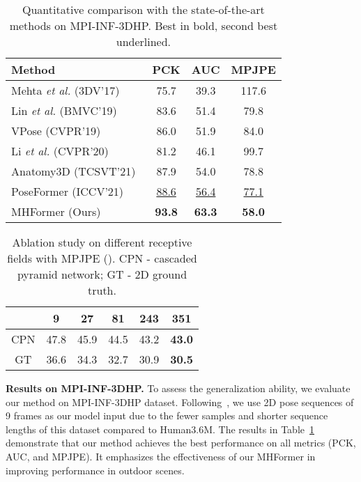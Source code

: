 \documentclass[10pt,twocolumn,letterpaper]{article}
\def\VspaceL{\vspace{-0.40cm}}
\def\VspaceS{\vspace{-0.30cm}}
\begin{document}
\begin{table}
  \footnotesize
  \centering
  \caption
  {
    Quantitative comparison with the state-of-the-art methods on MPI-INF-3DHP. 
    Best in bold, second best underlined.
  }
  \setlength{\tabcolsep}{3.90mm} 
  \begin{tabular}{@{}l|ccc@{}}
  \toprule
  Method & PCK  & AUC  & MPJPE  \\
  \midrule
  Mehta \emph{et al.} (3DV'17)~\cite{mehta2017monocular} & 75.7 & 39.3 & 117.6 \\
  Lin \emph{et al.} (BMVC'19)~\cite{lin2019trajectory} & 83.6 & 51.4 & 79.8 \\
  VPose (CVPR'19)~\cite{pavllo20193d} &86.0 &51.9 &84.0 \\
  Li \emph{et al.} (CVPR'20)~\cite{li2020cascaded} &81.2 &46.1 &99.7 \\
  Anatomy3D (TCSVT'21)~\cite{chen2021anatomy} &87.9 &54.0 &78.8 \\
  PoseFormer (ICCV'21)~\cite{poseformer} &\underline{88.6} &\underline{56.4} &\underline{77.1} \\ 

  \midrule
  MHFormer (Ours) &\textbf{93.8} &\textbf{63.3} &\textbf{58.0} \\
  \bottomrule
  \end{tabular}
  \label{table:3dhp}
  \VspaceS
\end{table}

\begin{table}[tb]
  \centering  
  \footnotesize
  \caption
  {
    Ablation study on different receptive fields with MPJPE ().
    CPN - cascaded pyramid network; 
    GT - 2D ground truth.
  }
  \setlength{\tabcolsep}{4.25mm}
  \begin{tabular}{cccccc}
  \toprule [1pt]
   &9 &27 &81 &243 &351 \\
  \midrule [0.5pt]
  CPN &47.8 &45.9 &44.5 &43.2 &\textbf{43.0} \\
  GT &36.6 &34.3 &32.7 &30.9 &\textbf{30.5} \\
  \toprule [1pt]
  \end{tabular}
  \label{table:frames}
  \VspaceL
\end{table}

\noindent \textbf{Results on MPI-INF-3DHP.}
To assess the generalization ability, we evaluate our method on MPI-INF-3DHP dataset. 
Following~\cite{poseformer}, we use 2D pose sequences of 9 frames as our model input due to the fewer samples and shorter sequence lengths of this dataset compared to Human3.6M. 
The results in Table~\ref{table:3dhp} demonstrate that our method achieves the best performance on all metrics (PCK, AUC, and MPJPE). 
It emphasizes the effectiveness of our MHFormer in improving performance in outdoor scenes. 
\end{document}
